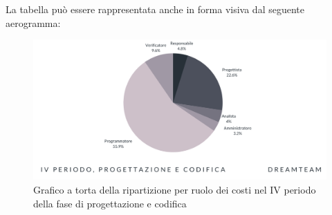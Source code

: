 La tabella può essere rappresentata anche in forma visiva dal seguente aerogramma:
\begin{figure}[H]
\centering
\includegraphics[scale=0.65]{Sezioni/SezioniPreventivo/grafici/Progettazione_IV_periodo_costi.png}
\caption{Grafico a torta della ripartizione per ruolo dei costi nel IV periodo della fase di progettazione e codifica}
\end{figure}


